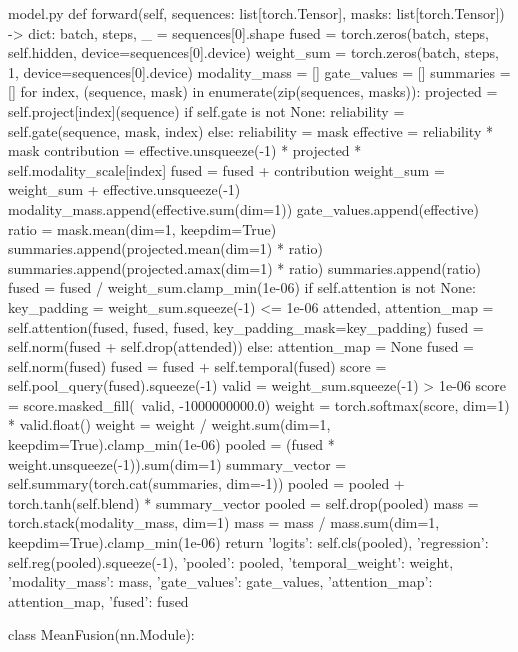 \documentclass[bwprint]{gmcmthesis}
\begin{document}
\begin{appendices}
\begin{Python}{model.py}
    def forward(self, sequences: list[torch.Tensor], masks: list[torch.Tensor]) -> dict:
        batch, steps, _ = sequences[0].shape
        fused = torch.zeros(batch, steps, self.hidden, device=sequences[0].device)
        weight_sum = torch.zeros(batch, steps, 1, device=sequences[0].device)
        modality_mass = []
        gate_values = []
        summaries = []
        for index, (sequence, mask) in enumerate(zip(sequences, masks)):
            projected = self.project[index](sequence)
            if self.gate is not None:
                reliability = self.gate(sequence, mask, index)
            else:
                reliability = mask
            effective = reliability * mask
            contribution = effective.unsqueeze(-1) * projected * self.modality_scale[index]
            fused = fused + contribution
            weight_sum = weight_sum + effective.unsqueeze(-1)
            modality_mass.append(effective.sum(dim=1))
            gate_values.append(effective)
            ratio = mask.mean(dim=1, keepdim=True)
            summaries.append(projected.mean(dim=1) * ratio)
            summaries.append(projected.amax(dim=1) * ratio)
            summaries.append(ratio)
        fused = fused / weight_sum.clamp_min(1e-06)
        if self.attention is not None:
            key_padding = weight_sum.squeeze(-1) <= 1e-06
            attended, attention_map = self.attention(fused, fused, fused, key_padding_mask=key_padding)
            fused = self.norm(fused + self.drop(attended))
        else:
            attention_map = None
            fused = self.norm(fused)
        fused = fused + self.temporal(fused)
        score = self.pool_query(fused).squeeze(-1)
        valid = weight_sum.squeeze(-1) > 1e-06
        score = score.masked_fill(~valid, -1000000000.0)
        weight = torch.softmax(score, dim=1) * valid.float()
        weight = weight / weight.sum(dim=1, keepdim=True).clamp_min(1e-06)
        pooled = (fused * weight.unsqueeze(-1)).sum(dim=1)
        summary_vector = self.summary(torch.cat(summaries, dim=-1))
        pooled = pooled + torch.tanh(self.blend) * summary_vector
        pooled = self.drop(pooled)
        mass = torch.stack(modality_mass, dim=1)
        mass = mass / mass.sum(dim=1, keepdim=True).clamp_min(1e-06)
        return {'logits': self.cls(pooled), 'regression': self.reg(pooled).squeeze(-1), 'pooled': pooled, 'temporal_weight': weight, 'modality_mass': mass, 'gate_values': gate_values, 'attention_map': attention_map, 'fused': fused}

class MeanFusion(nn.Module):


\end{Python}
\end{appendices}
\end{document}
